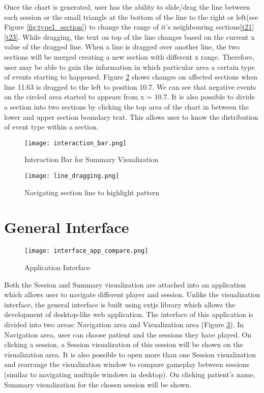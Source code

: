 Once the chart is generated, user has the ability to slide/drag the line between each session or the small triangle at the bottom of the line to the right or left(see Figure \ref{fig:type1_section}) to change the range of it's neighbouring sections\ref{t21}\ref{t23}. While dragging, the text on top of the line changes based on the current x value of the dragged line. When a line is dragged over another line, the two sections will be merged creating a new section with different x range. Therefore, user may be able to gain the information in which particular area a certain type of events starting to happened. Figure \ref{fig:line_dragging} shows changes on affected sections when line 11.63 is dragged to the left to position 10.7. We can see that negative events on the circled area started to appears from x = 10.7. It is also possible to divide a section into two sections by clicking the top area of the chart in between the lower and upper section boundary text. This allows user to know the distribution of event type within a section.

\begin{figure}
\centering
\texttt{[image: interaction\_bar.png]}
\caption{Interaction Bar for Summary Visualization}
\label{fig:interaction_bar}
\end{figure}
\begin{figure}
\centering
\texttt{[image: line\_dragging.png]}
\caption{Navigating section line to highlight pattern}
\label{fig:line_dragging}
\end{figure}

\section{General Interface}
\begin{figure}[H]
\centering
\texttt{[image: interface\_app\_compare.png]}
\caption{Application Interface}
\label{fig:app_interface}
\end{figure}
Both the Session and Summary visualization are attached into an application which allows user to navigate different player and session. Unlike the visualization interface, the general interface is built using extjs library which allows the development of desktop-like web application. The interface of this application is divided into two areas: Navigation area and Visualization area (Figure \ref{fig:app_interface}). In Navigation area, user can choose patient and the sessions they have played. On clicking a session, a Session visualization of this session will be shown on the visualization area. It is also possible to open more than one Session visualization and rearrange the visualization window to compare gameplay between sessions (similar to navigating multiple windows in desktop). On clicking patient's name, Summary visualization for the chosen session will be shown.
